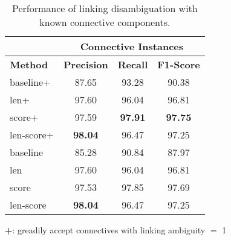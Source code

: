 \begin{table}[ht]
\centering
\begin{tabular}{|l|c|c|c|}
\hline
                            & \multicolumn{3}{c|}{Connective Instances}  \\ \hline
\bf Method                  & \bf Precision & \bf Recall & \bf F1-Score  \\ \hline
    baseline+               &     87.65     &     93.28  &     90.38     \\ \hline
    len+                    &     97.60     &     96.04  &     96.81     \\ \hline
    score+                  &     97.59     & \bf 97.91  & \bf 97.75     \\ \hline
    len-score+              & \bf 98.04     &     96.47  &     97.25     \\


\hhline{|=|=|=|=|}

    baseline                &     85.28     &     90.84  &     87.97     \\ \hline
    len                     &     97.60     &     96.04  &     96.81     \\ \hline
    score                   &     97.53     &     97.85  &     97.69     \\ \hline
    len-score               & \bf 98.04     &     96.47  &     97.25     \\ \hline

\end{tabular}
\begin{flushleft}
\small
\textbf{+}: greadily accept connectives with linking ambiguity $=$ 1
\end{flushleft}
\caption{\label{t:linking-perfect-methods} Performance of linking
disambiguation with known connective components. }
\end{table}

